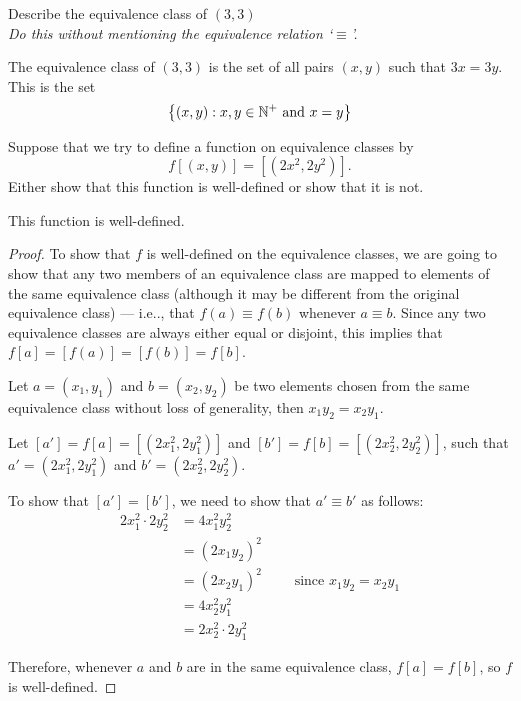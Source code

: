 \begin{problem}
\begin{enumalph}
\begin{Answer}
      \end{Answer}
    \newpage
    \item Describe the equivalence class of $(3, 3)$\\
      \emph{Do this without mentioning the equivalence relation `$\equiv$'.}
      \begin{Answer}
        The equivalence class of $(3, 3)$ is the set of all pairs $(x, y)$
        such that $3x = 3y$.
        This is the set
        \[ \left\{(x, y) : x, y \in \mathbb{N}^+ \text{ and } x = y\right\}\]
      \end{Answer} 
    \item Suppose that we try to define a function on equivalence classes by
      \[ f[(x, y)] = [(2x^2, 2y^2)]. \]
      Either show that this function is well-defined or show that it is not.
      \begin{Answer}
        \begin{claim}
          This function is well-defined.

          \begin{proof}
            To show that $f$ is well-defined on the equivalence classes,
            we are going to show that any two members of an equivalence class
            are mapped to elements of the same equivalence class
            (although it may be different from the original equivalence class) ---
            i.e.., that $f(a) \equiv f(b)$ whenever $a \equiv b$.
            Since any two equivalence classes are always either equal or disjoint,
            this implies that $f[a] = [f(a)] = [f(b)] = f[b]$.

            \step
            Let $a = (x_1, y_1)$ and $b = (x_2, y_2)$ be two elements chosen from the same
            equivalence class without loss of generality, then $x_1 y_2 = x_2 y_1$.
    
            \step
            Let $[a'] = f[a] = [(2x_1^2, 2y_1^2)]$ and $[b'] = f[b] = [(2x_2^2, 2y_2^2)]$,
            such that $a' = (2x_1^2, 2y_1^2)$ and $b' = (2x_2^2, 2y_2^2)$.

            \step
            To show that $[a'] = [b']$, we need to show that $a' \equiv b'$ as follows:
            \begin{align*}
              2x_1^2 \cdot 2y_2^2 &= 4x_1^2 y_2^2 \\
              &= (2x_1y_2)^2 \\
              &= (2x_2y_1)^2 \quad \quad \text{ since $x_1y_2 = x_2 y_1$}\\
              &= 4x_2^2 y_1^2 \\
              &= 2x_2^2 \cdot 2y_1^2
            \end{align*}
    
            \step
            Therefore, whenever $a$ and $b$ are in the same equivalence class,
            $f[a] = f[b]$, so $f$ is well-defined.
            
            
          \end{proof}
        \end{claim}
      \end{Answer}
  \end{enumalph}
\end{problem}
